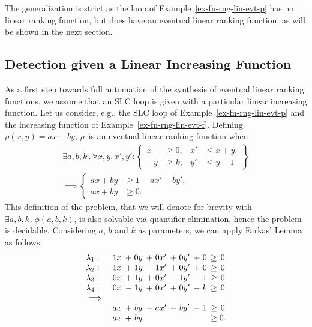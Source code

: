 \documentclass{acm_proc_article-sp}
\newcommand{\st}{\mathrel{.}}
\newcommand{\itc}{\mathrel{:}}
\begin{document}
The generalization is strict as the loop of
Example~\ref{ex-fn-rng-lin-evt-p} has no linear ranking function, but
does have an eventual linear ranking function, as will be shown in the
next section.


\subsection{Detection given a Linear Increasing Function}
\label{sec:elrf-semi-detection}

As a first step towards full automation of the synthesis of eventual
linear ranking functions, we assume that an SLC loop is given with a
particular linear increasing function.
Let us consider, e.g., the SLC loop of
Example~\ref{ex-fn-rng-lin-evt-p} and the increasing
function of Example~\ref{ex-fn-rng-lin-evt-f}.
Defining $\rho(x, y) = a x + b y$,
$\rho$~is an eventual linear ranking function when
\begin{multline*}
  \exists a, b, k  \st \forall x, y, x', y' \itc
    \left\{
      \begin{aligned}
         x &\ge 0, & x' &\le x + y, \\
        -y &\ge k, & y' &\le y - 1
       \end{aligned}
    \right\} \\
      \implies
        \left\{
          \begin{aligned}
            ax + by &\ge 1 + ax' + by', \\
            ax + by &\ge 0.
          \end{aligned}
        \right.
\end{multline*}
This definition of the problem, that we will denote for brevity with
$\exists a, b, k \st \phi(a, b, k)$, is also solvable via quantifier
elimination, hence the problem is decidable.
Considering $a$, $b$ and $k$ as parameters,
we can apply Farkas' Lemma as follows:
\[
  \begin{array}{lc@{\hspace{1ex}}c@{\;}c@{\hspace{1ex}}c@{\;}c@{\hspace{1ex}}c@{\;}c@{\hspace{1ex}}c@{\;}c@{\hspace{1ex}}c@{\;}c@{\hspace{1ex}}}
    \lambda_1: & 1x & + & 0y & + & 0x' & + & 0y' & + & 0 & \ge & 0 \\
    \lambda_2: & 1x & + & 1y & - & 1x' & + & 0y' & + & 0 & \ge & 0 \\
    \lambda_3: & 0x & + & 1y & + & 0x' & - & 1y' & - & 1 & \ge & 0 \\
    \lambda_4: & 0x & - & 1y & + & 0x' & + & 0y' & - & k & \ge & 0 \\
    \implies \\
               & ax & + & by & - & ax' & - & by' & - & 1 & \ge & 0 \\
               & ax & + & by &   &     &   &     &   &   & \ge & 0.
  \end{array}
\]
\end{document}
